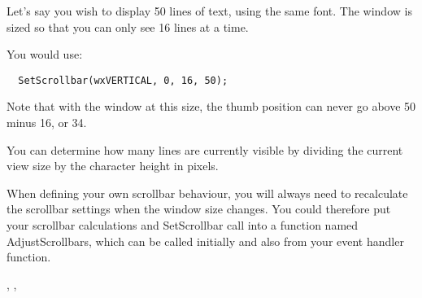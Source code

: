 


Let's say you wish to display 50 lines of text, using the same font.
The window is sized so that you can only see 16 lines at a time.

You would use:

{\small%
\begin{verbatim}
  SetScrollbar(wxVERTICAL, 0, 16, 50);
\end{verbatim}
}

Note that with the window at this size, the thumb position can never go
above 50 minus 16, or 34.

You can determine how many lines are currently visible by dividing the current view
size by the character height in pixels.

When defining your own scrollbar behaviour, you will always need to recalculate
the scrollbar settings when the window size changes. You could therefore put your
scrollbar calculations and SetScrollbar
call into a function named AdjustScrollbars, which can be called initially and also
from your  event handler function.


,\rtfsp
{}, 

